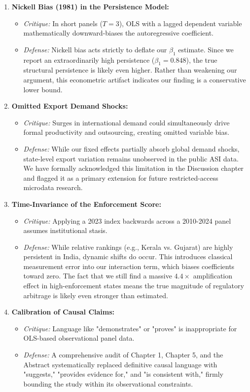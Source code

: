 \documentclass[11pt]{article}
\begin{document}
	\begin{enumerate}
		\item \textbf{Nickell Bias (1981) in the Persistence Model:} 
		\begin{itemize}
			\item \textit{Critique:} In short panels ($T=3$), OLS with a lagged dependent variable mathematically downward-biases the autoregressive coefficient. 
			\item \textit{Defense:} Nickell bias acts strictly to deflate our $\beta_1$ estimate. Since we report an extraordinarily high persistence ($\beta_1 = 0.848$), the true structural persistence is likely even higher. Rather than weakening our argument, this econometric artifact indicates our finding is a conservative lower bound.
		\end{itemize}
		\item \textbf{Omitted Export Demand Shocks:}
		\begin{itemize}
			\item \textit{Critique:} Surges in international demand could simultaneously drive formal productivity and outsourcing, creating omitted variable bias.
			\item \textit{Defense:} While our fixed effects partially absorb global demand shocks, state-level export variation remains unobserved in the public ASI data. We have formally acknowledged this limitation in the Discussion chapter and flagged it as a primary extension for future restricted-access microdata research.
		\end{itemize}
		\item \textbf{Time-Invariance of the Enforcement Score:}
		\begin{itemize}
			\item \textit{Critique:} Applying a 2023 index backwards across a 2010-2024 panel assumes institutional stasis.
			\item \textit{Defense:} While relative rankings (e.g., Kerala vs. Gujarat) are highly persistent in India, dynamic shifts do occur. This introduces classical measurement error into our interaction term, which biases coefficients toward zero. The fact that we still find a massive $4.4\times$ amplification effect in high-enforcement states means the true magnitude of regulatory arbitrage is likely even stronger than estimated.
		\end{itemize}
		\item \textbf{Calibration of Causal Claims:}
		\begin{itemize}
			\item \textit{Critique:} Language like "demonstrates" or "proves" is inappropriate for OLS-based observational panel data.
			\item \textit{Defense:} A comprehensive audit of Chapter 1, Chapter 5, and the Abstract systematically replaced definitive causal language with "suggests," "provides evidence for," and "is consistent with," firmly bounding the study within its observational constraints.
		\end{itemize}
	\end{enumerate}
	
\end{document}
